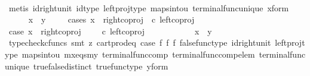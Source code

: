 \begin{isabellebody}
\ \ \ \ \ \ \isamarkupfalse%
\ {\isacharparenleft}{\kern0pt}metis\ id{\isacharunderscore}{\kern0pt}right{\isacharunderscore}{\kern0pt}unit{}\ id{\isacharunderscore}{\kern0pt}type\ left{\isacharunderscore}{\kern0pt}proj{\isacharunderscore}{\kern0pt}type\ maps{\isacharunderscore}{\kern0pt}into{\isacharunderscore}{\kern0pt}{}u{}\ terminal{\isacharunderscore}{\kern0pt}func{\isacharunderscore}{\kern0pt}unique\ x{\isacharunderscore}{\kern0pt}form{\isacharparenright}{\kern0pt}\isanewline
\ \ \ \ \isamarkupfalse%
\ {\isachardoublequoteopen}x\ {\isacharequal}{\kern0pt}\ y{\isachardoublequoteclose}\isanewline
\ \ \ \ \isamarkupfalse%
{\isacharparenleft}{\kern0pt}cases\ {\isachardoublequoteopen}x\ {\isacharequal}{\kern0pt}\ {\isacharparenleft}{\kern0pt}right{\isacharunderscore}{\kern0pt}coproj\ {\isasymone}\ {\isacharparenleft}{\kern0pt}{\isasymone}{\isasymCoprod}{\isasymone}{\isacharparenright}{\kern0pt}{\isasymcirc}\isactrlsub c\ left{\isacharunderscore}{\kern0pt}coproj\ {\isasymone}\ {\isasymone}{\isacharparenright}{\kern0pt}{\isachardoublequoteclose}{\isacharparenright}{\kern0pt}\isanewline
\ \ \ \ \ \ \isamarkupfalse%
\ case{}{\isacharcolon}{\kern0pt}\ {\isachardoublequoteopen}x\ {\isacharequal}{\kern0pt}\ right{\isacharunderscore}{\kern0pt}coproj\ {\isasymone}\ {\isacharparenleft}{\kern0pt}{\isasymone}\ {\isasymCoprod}\ {\isasymone}{\isacharparenright}{\kern0pt}\ {\isasymcirc}\isactrlsub c\ left{\isacharunderscore}{\kern0pt}coproj\ {\isasymone}\ {\isasymone}{\isachardoublequoteclose}\isanewline
\ \ \ \ \ \ \isamarkupfalse%
\ \isamarkupfalse%
\ {\isachardoublequoteopen}x\ {\isacharequal}{\kern0pt}\ y{\isachardoublequoteclose}\isanewline
\ \ \ \ \ \ \ \ \isamarkupfalse%
\ {\isacharparenleft}{\kern0pt}typecheck{\isacharunderscore}{\kern0pt}cfuncs{\isacharcomma}{\kern0pt}\ smt\ {\isacharparenleft}{\kern0pt}z{}{\isacharparenright}{\kern0pt}\ cart{\isacharunderscore}{\kern0pt}prod{\isacharunderscore}{\kern0pt}eq{}\ case{}\ f{}\ f{}\ f{}\ false{\isacharunderscore}{\kern0pt}func{\isacharunderscore}{\kern0pt}type\ id{\isacharunderscore}{\kern0pt}right{\isacharunderscore}{\kern0pt}unit{}\ left{\isacharunderscore}{\kern0pt}proj{\isacharunderscore}{\kern0pt}type\ maps{\isacharunderscore}{\kern0pt}into{\isacharunderscore}{\kern0pt}{}u{}\ mx{\isacharunderscore}{\kern0pt}eqs{\isacharunderscore}{\kern0pt}my\ terminal{\isacharunderscore}{\kern0pt}func{\isacharunderscore}{\kern0pt}comp\ terminal{\isacharunderscore}{\kern0pt}func{\isacharunderscore}{\kern0pt}comp{\isacharunderscore}{\kern0pt}elem\ terminal{\isacharunderscore}{\kern0pt}func{\isacharunderscore}{\kern0pt}unique\ true{\isacharunderscore}{\kern0pt}false{\isacharunderscore}{\kern0pt}distinct\ true{\isacharunderscore}{\kern0pt}func{\isacharunderscore}{\kern0pt}type\ y{\isacharunderscore}{\kern0pt}form{\isacharparenright}{\kern0pt}\ \ \ \ \ \ \ \ \isanewline

\end{isabellebody}
